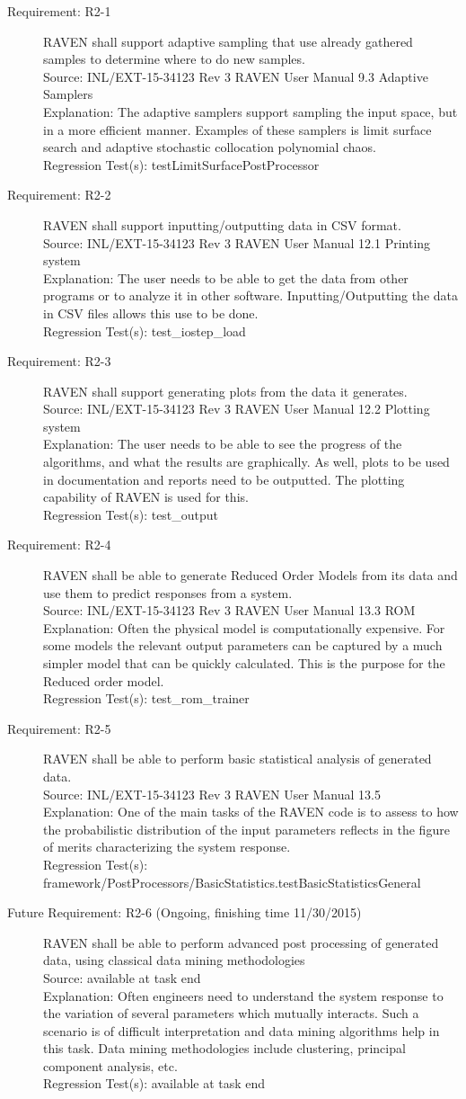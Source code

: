 \documentclass{article}
\newcommand{\requirement}[5]{\item[Requirement: #1] #2 \\Source: #3\\Explanation: #4\\Regression Test(s): #5}
\newcommand{\futurerequirement}[6]{\item[Future Requirement: #1 #6] #2 \\Source: #3\\Explanation: #4\\Regression Test(s): #5}
\begin{document}
\begin{description}

\requirement{R2-1}{RAVEN shall support adaptive sampling that use already gathered samples to determine where to do new samples.}
{INL/EXT-15-34123 Rev 3 RAVEN User Manual 9.3 Adaptive Samplers}
{The adaptive samplers support sampling the input space, but in a more efficient manner.  Examples of these samplers is limit surface search and adaptive stochastic collocation polynomial chaos.}
{testLimitSurfacePostProcessor}

\requirement{R2-2}{RAVEN shall support inputting/outputting data in CSV format.}
{INL/EXT-15-34123 Rev 3 RAVEN User Manual 12.1 Printing system}
{The user needs to be able to get the data from other programs or to analyze it in other software.  Inputting/Outputting the data in CSV files allows this use to be done.}
{test\_iostep\_load}

\requirement{R2-3}{RAVEN shall support generating plots from the data it generates.}
{INL/EXT-15-34123 Rev 3 RAVEN User Manual 12.2 Plotting system}
{The user needs to be able to see the progress of the algorithms, and what the results are graphically.  As well, plots to be used in documentation and reports need to be outputted.  The plotting capability of RAVEN is used for this.}
{test\_output}

\requirement{R2-4}{RAVEN shall be able to generate Reduced Order Models from its data and use them to predict responses from a system.}
{INL/EXT-15-34123 Rev 3 RAVEN User Manual 13.3 ROM}
{Often the physical model is computationally expensive.  For some models the relevant output parameters can be captured by a much simpler model that can be quickly calculated.  This is the purpose for the Reduced order model.}
{test\_rom\_trainer}

\requirement{R2-5}{RAVEN shall be able to perform basic statistical analysis of generated data.}
{INL/EXT-15-34123 Rev 3 RAVEN User Manual 13.5}
{One of the main tasks of the RAVEN code is to assess to how the probabilistic distribution of the input parameters reflects in the figure of merits characterizing the system response.}
{framework/PostProcessors/BasicStatistics.testBasicStatisticsGeneral}

\futurerequirement{R2-6}{RAVEN shall be able to perform advanced post processing of generated data, using classical data mining methodologies}
{available at task end}
{Often engineers need to understand the system response to the variation of several parameters which mutually interacts. Such a scenario is of difficult interpretation and data mining algorithms help in this task.  Data mining methodologies include clustering, principal component analysis, etc.}
{available at task end}
{(Ongoing, finishing time 11/30/2015)}


\end{description}
\end{document}
